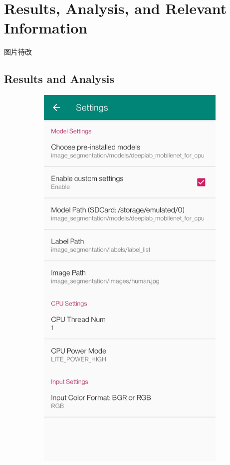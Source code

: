 \section{Results, Analysis, and Relevant Information}

图片待改

\subsection{Results and Analysis}
\begin{figure}[htbp]
    \centering
    \begin{subfigure}[t]{0.4\linewidth}
        \includegraphics[width=1\textwidth]{figures/settings.jpg}

\end{subfigure}
\end{figure}

